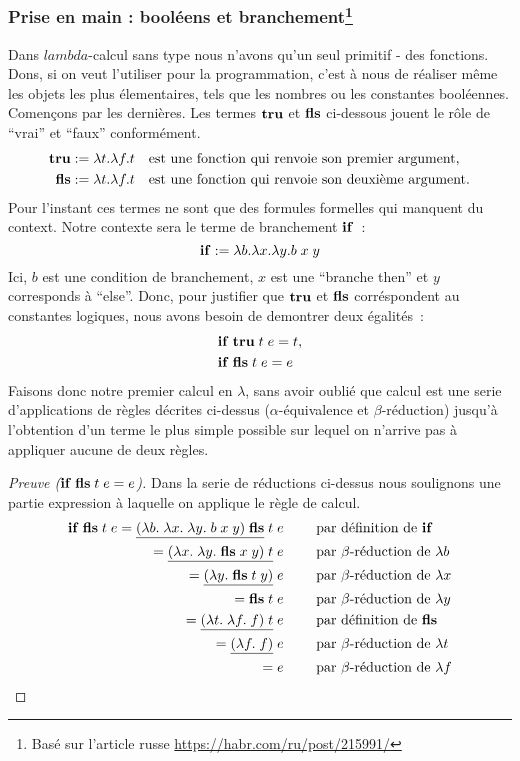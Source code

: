 \subsubsection*{Prise en main : booléens et branchement\footnote{Basé sur l'article russe \url{https://habr.com/ru/post/215991/}}}
Dans $lambda$-calcul sans type nous n'avons qu'un seul primitif - des fonctions.
Dons, si on veut l'utiliser pour la programmation, c'est à nous de réaliser même les objets les plus élementaires, tels que les nombres ou les constantes booléennes.
Començons par les dernières.
Les termes $\mathbf{tru}$ et $\mathbf{fls}$ ci-dessous jouent le rôle de ``vrai'' et ``faux'' conformément.
\begin{eqnarray*}
\mathbf{tru} &:= \lambda t.\lambda f.t \quad \text{est une fonction qui renvoie son premier argument,} \\
\mathbf{fls} &:= \lambda t.\lambda f.t \quad \text{est une fonction qui renvoie son deuxième argument.}
\end{eqnarray*}
Pour l'instant ces termes ne sont que des formules formelles qui manquent du context.
Notre contexte sera le terme de branchement $\mathbf{if}$~:
$$\mathbf{if} := \lambda b.\lambda x.\lambda y.b \; x \; y$$
Ici, $b$ est une condition de branchement, $x$ est une ``branche then'' et $y$ corresponds à ``else''.
Donc, pour justifier que $\mathbf{tru}$ et $\mathbf{fls}$ corréspondent au constantes logiques, nous avons besoin de demontrer deux égalités~:
\begin{eqnarray*}
	& \mathbf{if} \; \mathbf{tru} \; t \; e = t, \\
	& \mathbf{if} \; \mathbf{fls} \; t \; e = e
\end{eqnarray*}
Faisons donc notre premier calcul en $\lambda$, sans avoir oublié que calcul est une serie d'applications de règles décrites ci-dessus ($\alpha$-équivalence et $\beta$-réduction) jusqu'à l'obtention d'un terme le plus simple possible sur lequel on n'arrive pas à appliquer aucune de deux règles.
\begin{proof}[Preuve ($\mathbf{if} \; \mathbf{fls} \; t \; e = e$)]
	Dans la serie de réductions ci-dessus nous soulignons une partie expression à laquelle on applique le règle de calcul.
	\begin{eqnarray*}
		\mathbf{if} \; \mathbf{fls} \; t \; e
		= \underline{(\lambda b. \; \lambda x. \; \lambda y. \; b \; x \; y) \; \mathbf{fls}} \; t \; e
			& \qquad \text{ par définition de $\mathbf{if}$}\\ 
		= \underline{(\lambda x. \; \lambda y. \; \mathbf{fls} \; x \; y) \; t} \; e
			& \qquad \text{ par $\beta$-réduction de $\lambda b$}\\
		= \underline{(\lambda y. \; \mathbf{fls} \; t \; y)} \; e
			& \qquad \text{ par $\beta$-réduction de $\lambda x$}\\
		= \mathbf{fls} \; t \; e
			& \qquad \text{ par $\beta$-réduction de $\lambda y$}\\
		= \underline{(\lambda t. \; \lambda f. \; f) \; t} \; e
			& \qquad \text{ par définition de $\mathbf{fls}$}\\
		= \underline{(\lambda f. \; f)} \; e
			& \qquad \text{ par $\beta$-réduction de $\lambda t$}\\
		= e
			& \qquad \text{ par $\beta$-réduction de $\lambda f$}
	\end{eqnarray*}
\end{proof}
